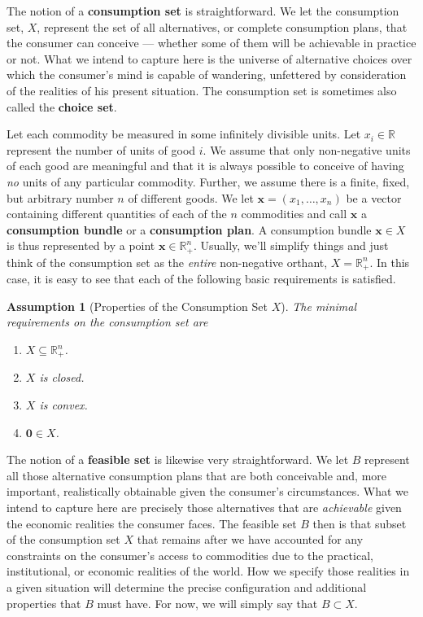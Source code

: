 \documentclass[b5paper]{memoir}
\newtheorem{assump}{Assumption}
\let\markupwd\textbf
\begin{document}
The notion of a \markupwd{consumption set} is straightforward. We let the consumption set, $X$,
represent the set of all alternatives, or complete consumption plans, that the consumer
can conceive --- whether some of them will be achievable in practice or not. What we
intend to capture here is the universe of alternative choices over which the consumer’s
mind is capable of wandering, unfettered by consideration of the realities of his present
situation. The consumption set is sometimes also called the \markupwd{choice set}.

Let each commodity be measured in some infinitely divisible units. Let $x_i \in \mathbb{R}$
represent the number of units of good $i$. We assume that only non-negative units of each
good are meaningful and that it is always possible to conceive of having \emph{no} units
of any particular commodity. Further, we assume there is a finite, fixed, but arbitrary
number $n$ of different goods. We let $\mathbf x = (x_1, \ldots, x_n )$ be a vector
containing different quantities of each of the $n$ commodities and call $\mathbf x$ a
\markupwd{consumption bundle} or a \markupwd{consumption plan}. A consumption bundle
$\mathbf x \in X$ is thus represented by a point $\mathbf x \in \mathbb{R}^n_+$. Usually,
we’ll simplify things and just think of the consumption set as the \emph{entire}
non-negative orthant, $X = \mathbb{R}^n_+$. In this case, it is easy to see that each 
of the following basic requirements is satisfied.

\begin{assump}[Properties of the Consumption Set $X$]
The minimal requirements on the consumption set are
\begin{enumerate} 
\item $X \subseteq \mathbb{R}^n_+$.
\item $X$ is closed.
\item $X$ is convex.
\item $\mathbf 0 \in X$.
\end{enumerate}
\end{assump}

The notion of a \markupwd{feasible set} is likewise very straightforward. We let $B$ represent
all those alternative consumption plans that are both conceivable and, more important,
realistically obtainable given the consumer’s circumstances. What we intend to capture
here are precisely those alternatives that are \emph{achievable} given the economic
realities the consumer faces. The feasible set $B$ then is that subset of the consumption
set $X$ that remains after we have accounted for any constraints on the consumer’s access
to commodities due to the practical, institutional, or economic realities of the world.
How we specify those realities in a given situation will determine the precise
configuration and additional properties that $B$ must have. 
For now, we will simply say that $B \subset X$.
\end{document}
